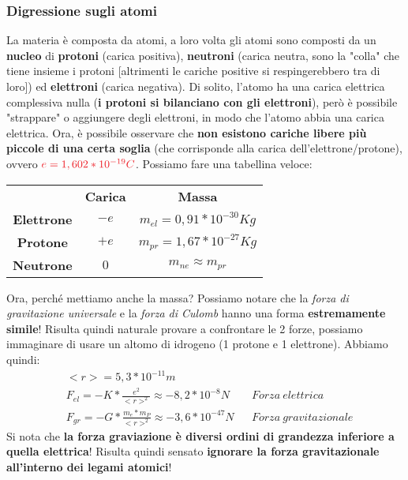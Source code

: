         \subsubsection{Digressione sugli atomi}
            La materia è composta da atomi, a loro volta gli atomi sono composti da un \textbf{nucleo} di \textbf{protoni} (carica positiva), \textbf{neutroni} (carica neutra, sono la "colla" che tiene insieme i protoni [altrimenti le cariche positive si respingerebbero tra di loro]) ed \textbf{elettroni} (carica negativa). Di solito, l'atomo ha una carica elettrica complessiva nulla (\textbf{i protoni si bilanciano con gli elettroni}), però è possibile "strappare" o aggiungere degli elettroni, in modo che l'atomo abbia una carica elettrica. Ora, è possibile osservare che \textbf{non esistono cariche libere più piccole di una certa soglia} (che corrisponde alla carica dell'elettrone/protone), ovvero $\textcolor{Red}{e=1,602*10^{-19}C}$. Possiamo fare una tabellina veloce:
            \begin{center}
                \begin{tabular}{ c c c }
                    & \textbf{Carica} & \textbf{Massa} \\ 
                    \textbf{Elettrone} & $-e$ & $m_{el}=0,91*10^{-30}Kg$ \\  
                    \textbf{Protone} & $+e$ & $m_{pr}=1,67*10^{-27}Kg$\\    
                    \textbf{Neutrone} & $0$ & $m_{ne}\approx m_{pr}$
                \end{tabular}
            \end{center}
            Ora, perché mettiamo anche la massa? Possiamo notare che la \textit{forza di gravitazione universale} e la \textit{forza di Culomb} hanno una forma \textbf{estremamente simile}! Risulta quindi naturale provare a confrontare le 2 forze, possiamo immaginare di usare un altomo di idrogeno (1 protone e 1 elettrone). Abbiamo quindi:
            \begin{align*}
                &<r> = 5,3*10^{-11}m\\
                &F_{el} = -K*\frac{e^2}{<r>^2}\approx-8,2*10^{-8}N && Forza\ elettrica\\
                &F_{gr} = -G*\frac{m_e*m_P}{<r>^2}\approx-3,6*10^{-47}N && Forza\ gravitazionale
            \end{align*}
            Si nota che \textbf{la forza graviazione è diversi ordini di grandezza inferiore a quella elettrica}! Risulta quindi sensato \textbf{ignorare la forza gravitazionale all'interno dei legami atomici}!


